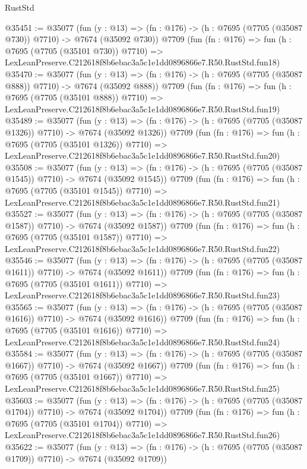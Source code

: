 \begin{lexlean}{RustStd}
\begin{coremodule}
@35451 := @35077
    (fun (y : @13) => (fn : @176) -> (h : @7695 (@7705 (@35087 @730)) @7710) -> @7674 (@35092 @730))
    @7709
    (fun (fn : @176) =>
    fun (h : @7695 (@7705 (@35101 @730)) @7710) =>
    LexLeanPreserve.C212618f8b6ebac3a5c1e1dd0896866e7.R50.RustStd.fun18)
@35470 := @35077
    (fun (y : @13) => (fn : @176) -> (h : @7695 (@7705 (@35087 @888)) @7710) -> @7674 (@35092 @888))
    @7709
    (fun (fn : @176) =>
    fun (h : @7695 (@7705 (@35101 @888)) @7710) =>
    LexLeanPreserve.C212618f8b6ebac3a5c1e1dd0896866e7.R50.RustStd.fun19)
@35489 := @35077
    (fun (y : @13) =>
    (fn : @176) -> (h : @7695 (@7705 (@35087 @1326)) @7710) -> @7674 (@35092 @1326))
    @7709
    (fun (fn : @176) =>
    fun (h : @7695 (@7705 (@35101 @1326)) @7710) =>
    LexLeanPreserve.C212618f8b6ebac3a5c1e1dd0896866e7.R50.RustStd.fun20)
@35508 := @35077
    (fun (y : @13) =>
    (fn : @176) -> (h : @7695 (@7705 (@35087 @1545)) @7710) -> @7674 (@35092 @1545))
    @7709
    (fun (fn : @176) =>
    fun (h : @7695 (@7705 (@35101 @1545)) @7710) =>
    LexLeanPreserve.C212618f8b6ebac3a5c1e1dd0896866e7.R50.RustStd.fun21)
@35527 := @35077
    (fun (y : @13) =>
    (fn : @176) -> (h : @7695 (@7705 (@35087 @1587)) @7710) -> @7674 (@35092 @1587))
    @7709
    (fun (fn : @176) =>
    fun (h : @7695 (@7705 (@35101 @1587)) @7710) =>
    LexLeanPreserve.C212618f8b6ebac3a5c1e1dd0896866e7.R50.RustStd.fun22)
@35546 := @35077
    (fun (y : @13) =>
    (fn : @176) -> (h : @7695 (@7705 (@35087 @1611)) @7710) -> @7674 (@35092 @1611))
    @7709
    (fun (fn : @176) =>
    fun (h : @7695 (@7705 (@35101 @1611)) @7710) =>
    LexLeanPreserve.C212618f8b6ebac3a5c1e1dd0896866e7.R50.RustStd.fun23)
@35565 := @35077
    (fun (y : @13) =>
    (fn : @176) -> (h : @7695 (@7705 (@35087 @1616)) @7710) -> @7674 (@35092 @1616))
    @7709
    (fun (fn : @176) =>
    fun (h : @7695 (@7705 (@35101 @1616)) @7710) =>
    LexLeanPreserve.C212618f8b6ebac3a5c1e1dd0896866e7.R50.RustStd.fun24)
@35584 := @35077
    (fun (y : @13) =>
    (fn : @176) -> (h : @7695 (@7705 (@35087 @1667)) @7710) -> @7674 (@35092 @1667))
    @7709
    (fun (fn : @176) =>
    fun (h : @7695 (@7705 (@35101 @1667)) @7710) =>
    LexLeanPreserve.C212618f8b6ebac3a5c1e1dd0896866e7.R50.RustStd.fun25)
@35603 := @35077
    (fun (y : @13) =>
    (fn : @176) -> (h : @7695 (@7705 (@35087 @1704)) @7710) -> @7674 (@35092 @1704))
    @7709
    (fun (fn : @176) =>
    fun (h : @7695 (@7705 (@35101 @1704)) @7710) =>
    LexLeanPreserve.C212618f8b6ebac3a5c1e1dd0896866e7.R50.RustStd.fun26)
@35622 := @35077
    (fun (y : @13) =>
    (fn : @176) -> (h : @7695 (@7705 (@35087 @1709)) @7710) -> @7674 (@35092 @1709))

\end{coremodule}
\end{lexlean}
